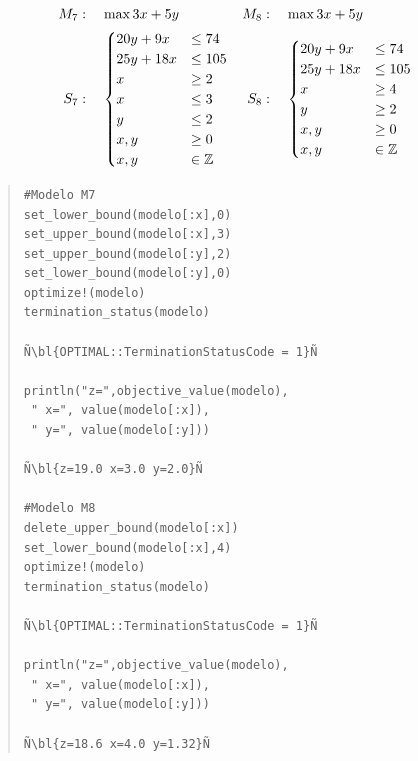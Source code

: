     \NAM{\begin{center}}{}
    \begin{minipage}{0.4\textwidth}
    	\begin{align*}
    	M_7&:\quad 	\max 3x+5y & M_8&:\quad 	\max 3x+5y\\ 
    	S_7&:\quad \begin{cases}
    	20y+9x&\leq 74\\
    	25y+18x&\leq 105\\
    	x&\geq 2\\
    	x&\leq 3\\
    	y&\leq 2\\
    	x,y&\geq 0\\
    	x,y&\in \mathbb Z\end{cases}&S_8&:\quad \begin{cases}
    	20y+9x&\leq 74\\
    	25y+18x&\leq 105\\
    	x&\geq 4\\
    	y&\geq 2\\
    	x,y&\geq 0\\
    	x,y&\in \mathbb Z\end{cases}
    	\end{align*}
    \end{minipage}
    \NAM{\end{center}}{}
    \begin{quote}
    \begin{lstlisting}[escapechar=Ñ]
#Modelo M7
set_lower_bound(modelo[:x],0)
set_upper_bound(modelo[:x],3)
set_upper_bound(modelo[:y],2) 
set_lower_bound(modelo[:y],0)
optimize!(modelo)
termination_status(modelo)

Ñ\bl{OPTIMAL::TerminationStatusCode = 1}Ñ

println("z=",objective_value(modelo),
 " x=", value(modelo[:x]),
 " y=", value(modelo[:y]))

Ñ\bl{z=19.0 x=3.0 y=2.0}Ñ

#Modelo M8
delete_upper_bound(modelo[:x])
set_lower_bound(modelo[:x],4)
optimize!(modelo)
termination_status(modelo)

Ñ\bl{OPTIMAL::TerminationStatusCode = 1}Ñ

println("z=",objective_value(modelo),
 " x=", value(modelo[:x]),
 " y=", value(modelo[:y]))
 
Ñ\bl{z=18.6 x=4.0 y=1.32}Ñ
    \end{lstlisting}
    \end{quote}
    \NAM{
    \end{minipage}
    \end{center}
    }{
    \end{minipage}
    }
    
